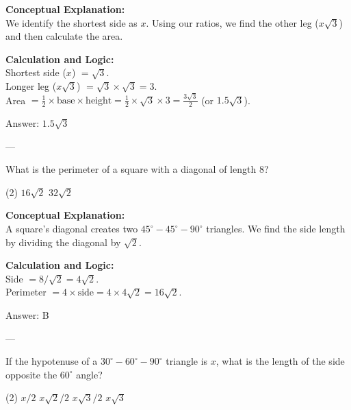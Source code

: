 \documentclass[11pt,paper=a4,answers]{exam}
\begin{document}
\begin{questions}
\begin{solution}
\textbf{Conceptual Explanation:} \\
We identify the shortest side as $x$. Using our ratios, we find the other leg ($x\sqrt{3}$) and then calculate the area.

\vspace{10pt}
\textbf{Calculation and Logic:} \\
Shortest side ($x$) $= \sqrt{3}$. \\
Longer leg ($x\sqrt{3}$) $= \sqrt{3} \times \sqrt{3} = 3$. \\
Area $= \frac{1}{2} \times \text{base} \times \text{height} = \frac{1}{2} \times \sqrt{3} \times 3 = \frac{3\sqrt{3}}{2}$ (or $1.5\sqrt{3}$).

\vspace{15pt}
Answer: \colorbox{yellow!100}{$1.5\sqrt{3}$}
\end{solution}

---

\question
What is the perimeter of a square with a diagonal of length 8?
\begin{tasks}(2)
    \task $16\sqrt{2}$
    \task $32\sqrt{2}$
\end{tasks}

\begin{solution}
\textbf{Conceptual Explanation:} \\
A square's diagonal creates two $45^\circ-45^\circ-90^\circ$ triangles. We find the side length by dividing the diagonal by $\sqrt{2}$.

\vspace{10pt}
\textbf{Calculation and Logic:} \\
Side $= 8 / \sqrt{2} = 4\sqrt{2}$. \\
Perimeter $= 4 \times \text{side} = 4 \times 4\sqrt{2} = 16\sqrt{2}$.

\vspace{15pt}
Answer: \colorbox{yellow!100}{B}
\end{solution}

---

\question
If the hypotenuse of a $30^\circ-60^\circ-90^\circ$ triangle is $x$, what is the length of the side opposite the $60^\circ$ angle?
\begin{tasks}(2)
    \task $x/2$
    \task $x\sqrt{2}/2$
    \task $x\sqrt{3}/2$
    \task $x\sqrt{3}$
\end{tasks}


\end{questions}
\end{document}
